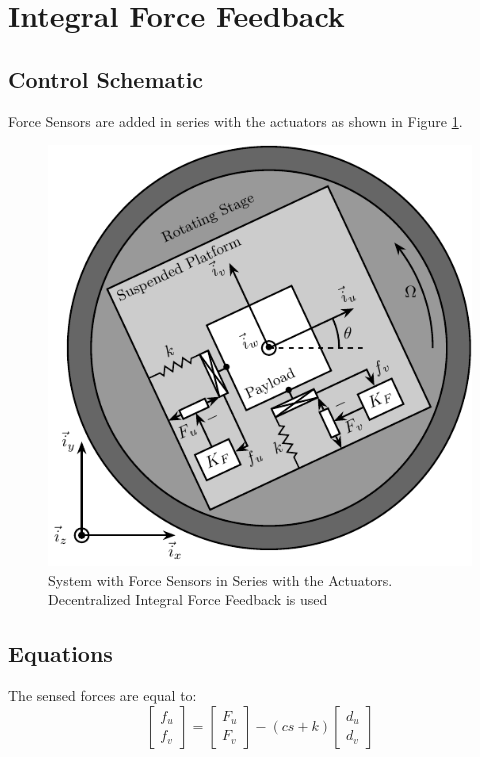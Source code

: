 \documentclass{ISMA_USD2020}
\begin{document}
\section{Integral Force Feedback}
\label{sec:org95f47e8}
\subsection{Control Schematic}
\label{sec:org8bb26ea}

Force Sensors are added in series with the actuators as shown in Figure \ref{fig:system_iff}.

\begin{figure}[htbp]
\centering
\includegraphics[scale=1]{figs/system_iff.pdf}
\caption{\label{fig:system_iff}System with Force Sensors in Series with the Actuators. Decentralized Integral Force Feedback is used}
\end{figure}

\subsection{Equations}
\label{sec:orgbd9ebe0}
The sensed forces are equal to:
\begin{equation}
\begin{bmatrix} f_{u} \\ f_{v} \end{bmatrix} =
\begin{bmatrix} F_u \\ F_v \end{bmatrix} - (c s + k)
\begin{bmatrix} d_u \\ d_v \end{bmatrix}
\end{equation}
\end{document}
